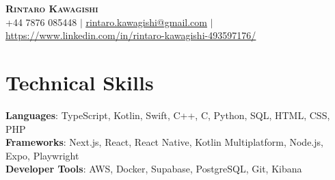 \documentclass[letterpaper,10pt]{article}
\begin{document}

\begin{center}
    \textbf{\Huge \scshape Rintaro Kawagishi} \\ \vspace{1pt}
    +44 7876 085448 $|$ 
		\href{mailto:rintaro.kawagishi@gmail.com}{\underline{rintaro.kawagishi@gmail.com}} $|$ 
    \href{https://www.linkedin.com/in/rintaro-kawagishi-493597176/}{\underline{https://www.linkedin.com/in/rintaro-kawagishi-493597176/}}
\end{center}

\section{Technical Skills}
 \begin{itemize}[leftmargin=0.15in, label={}]
    \small{\item{
     \textbf{Languages}{: TypeScript, Kotlin, Swift, C++, C, Python, SQL, HTML, CSS, PHP} \\
     \textbf{Frameworks}{: Next.js, React, React Native, Kotlin Multiplatform, Node.js, Expo, Playwright} \\
     \textbf{Developer Tools}{: AWS, Docker, Supabase, PostgreSQL, Git, Kibana}
    }}
 \end{itemize}
\end{document}
